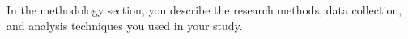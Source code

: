 In the methodology section, you describe the research methods, data collection, and analysis techniques you used in your study.
